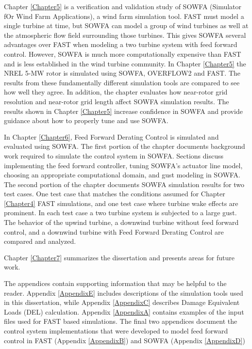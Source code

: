Chapter \ref{Chapter5} is a verification and validation study of SOWFA (Simulator fOr Wind Farm Applications), a wind farm simulation tool. FAST must model a single turbine at time, but SOWFA can model a group of wind turbines as well at the atmospheric flow field surrounding those turbines. This gives SOWFA several advantages over FAST when modeling a two turbine system with feed forward control. However, SOWFA is much more computationally expensive than FAST and is less established in the wind turbine community. In Chapter \ref{Chapter5} the NREL 5-MW rotor is simulated using SOWFA, OVERFLOW2 and FAST. The results from these fundamentally different simulation tools are compared to see how well they agree. In addition, the chapter evaluates how near-rotor grid resolution and near-rotor grid length affect SOWFA simulation results. The results shown in Chapter \ref{Chapter5} increase confidence in SOWFA and provide guidance about how to properly tune and use SOWFA.

In Chapter \ref{Chapter6}, Feed Forward Derating Control is simulated and evaluated using SOWFA. The first portion of the chapter documents background work required to simulate the control system in SOWFA. Sections discuss implementing the feed forward controller, tuning SOWFA's actuator line model, choosing an appropriate computational domain, and gust modeling in SOWFA. The second portion of the chapter documents SOWFA simulation results for two test cases. One test case that matches the conditions assumed for Chapter \ref{Chapter4} FAST simulations, and one test case where turbine wake effects are prominent. In each test case a two turbine system is subjected to a large gust. The behavior of the upwind turbine, a downwind turbine without feed forward control, and a downwind turbine with Feed Forward Derating Control are compared and analyzed.

Chapter \ref{Chapter7} summarizes the dissertation and presents areas for future work.

The appendices contain supporting information that may be helpful to the reader. Appendix \ref{AppendixE} includes descriptions of the simulation tools used in this dissertation, while Appendix \ref{AppendixC} describes Damage Equivalent Loads (DEL) calculation. Appendix \ref{AppendixA} contains examples of the input files used for FAST based simulations. The final two appendices document the control system implementations that were developed to model feed forward control in  FAST (Appendix \ref{AppendixB}) and SOWFA (Appendix \ref{AppendixD})

